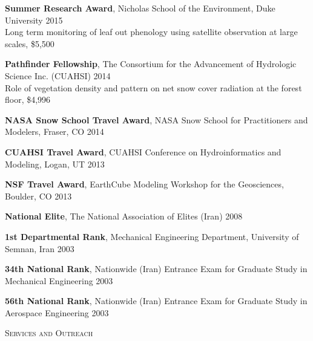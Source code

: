 \documentclass[10pt]{article}
\newenvironment{changemargin}[2]{%
  \begin{list}{}{%
 \setlength{\topsep}{0pt}%
 \setlength{\leftmargin}{#1}%
 \setlength{\rightmargin}{#2}%
 \setlength{\listparindent}{\parindent}%
 \setlength{\itemindent}{\parindent}%
 \setlength{\parsep}{\parskip}%
  }%
  \item[]}{\end{list}
}
\newcommand{\lineover}{
  \begin{changemargin}{-0.05in}{-0.05in}
  \vspace*{-8pt}
  \hrulefill \\
  \vspace*{-2pt}
  \end{changemargin}
}
\newcommand{\header}[1]{
  \begin{changemargin}{-0.5in}{-0.5in}
  \scshape{#1}\\
  \lineover
  \end{changemargin}
}
\newenvironment{body} {
  \vspace*{-2pt}
  \begin{changemargin}{-0.5in}{-0.5in}
}
{\end{changemargin}
}
\begin{document}
\begin{body}
  \textbf{Summer Research Award}, Nicholas School of the Environment, Duke University \hfill {2015}\\
  Long term monitoring of leaf out phenology using satellite observation at large scales, \$5,500 \\
  \medskip

  \textbf{Pathfinder Fellowship}, The Consortium for the Advancement of Hydrologic Science Inc. (CUAHSI)  \hfill {2014}\\
  Role of vegetation density and pattern on net snow cover radiation at the forest floor, \$4,996\\
  \medskip

  \textbf{NASA Snow School Travel Award},  NASA Snow School for Practitioners and Modelers, Fraser, CO \hfill {2014}\\
  \medskip

  \textbf{CUAHSI Travel Award}, CUAHSI Conference on Hydroinformatics and Modeling, Logan, UT \hfill {2013}\\
  \medskip

  \textbf{NSF Travel Award}, EarthCube Modeling Workshop for the Geosciences, Boulder, CO \hfill {2013}\\ \medskip

  \textbf{National Elite}, The National Association of Elites (Iran) \hfill {2008}\\ \medskip

  \textbf{1st Departmental Rank}, Mechanical Engineering Department, University of Semnan, Iran \hfill {2003}\\ \medskip

  \textbf{34th National Rank}, Nationwide (Iran) Entrance Exam for Graduate Study in Mechanical Engineering \hfill {2003}\\ \medskip

  \textbf{56th National Rank}, Nationwide (Iran) Entrance Exam for Graduate Study in Aerospace Engineering \hfill {2003}\\ \medskip

\end{body}
\medskip


\header{Services and Outreach}
\end{document}

